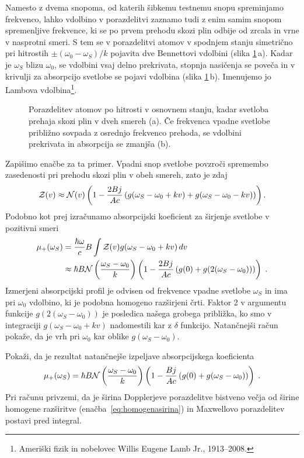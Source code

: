 Namesto z dvema snopoma, od katerih šibkemu testnemu snopu spreminjamo
frekvenco, lahko vdolbino v porazdelitvi zaznamo tudi z enim samim snopom
spremenljive frekvence, ki se po prvem prehodu skozi plin odbije od
zrcala in vrne v nasprotni smeri. S tem se v porazdelitvi atomov
v spodnjem stanju simetrično pri hitrostih $\pm(\omega_{0}-\omega_S)/k$
pojavita dve Bennettovi vdolbini (slika \ref{fig:Lamb}\,a).
Kadar je $\omega_S$ blizu $\omega_{0}$, se vdolbini vsaj delno prekrivata, 
stopnja nasičenja se poveča in v krivulji za absorpcijo svetlobe se pojavi 
vdolbina (slika \ref{fig:Lamb}\,b).
Imenujemo jo Lambova vdolbina\footnote{Ameriški fizik in nobelovec 
Willis Eugene Lamb Jr., 1913--2008.}. 
\begin{figure}[h]
\centering
\def\svgwidth{140truemm} 

\caption{Porazdelitev atomov po hitrosti v osnovnem stanju, kadar svetloba prehaja 
skozi plin v dveh smereh (a). Če frekvenca vpadne svetlobe približno sovpada z osrednjo
frekvenco prehoda, se vdolbini prekrivata in absorpcija se zmanjša (b).}
\label{fig:Lamb}
\end{figure}

Zapišimo enačbe za ta primer. Vpadni snop svetlobe povzroči spremembo zasedenosti
pri prehodu skozi plin v obeh smereh, zato je zdaj 
\begin{equation}
{\cal Z}(v)\approx{\cal N}(v)\left(1-\frac{2Bj}{Ac}\left(g(\omega_S-\omega_{0}+kv)+
g(\omega_S-\omega_{0}-kv)\right)\right).
\label{4.92}
\end{equation}
Podobno kot prej izračunamo absorpcijski koeficient za širjenje svetlobe v
pozitivni smeri 
\begin{align}
\mu_{+}(\omega_S) & =  \frac{\hbar\omega}{c}B\int{\cal Z}(v)g(\omega_S-\omega_{0}+kv)\, dv\nonumber \\
 & \approx  \hbar B{\cal N}\left(\frac{\omega_S-\omega_0}{k}\right)\left(1-\frac{2Bj}
 {Ac}\left(g(0)+g(2(\omega_S-\omega_{0}))\right)\right)\;.
 \label{eq:lamb}
\end{align}
Izmerjeni absorpcijski profil je odvisen od frekvence vpadne svetlobe $\omega_S$ in ima pri $\omega_0$ vdolbino,
ki je podobna homogeno razširjeni črti. Faktor 2 v argumentu
funkcije $g(2(\omega_S-\omega_{0}))$ je posledica našega grobega približka,
ko smo v integraciji $g(\omega_S-\omega_{0}+kv)$ nadomestili kar z
$\delta$ funkcijo. Natančnejši račun pokaže, da je vrh pri $\omega_{0}$
kar oblike $g(\omega_S-\omega_{0})$.

\begin{definition}
Pokaži, da je rezultat natančnejše izpeljave absorpcijskega koeficienta  
\begin{equation}
 \mu_{+}(\omega_S) = \hbar B{\cal N}\left(\frac{\omega_S-\omega_0}{k}\right)\left(1-\frac{Bj}
 {Ac}\left(g(0)+g(\omega_S-\omega_{0})\right)\right)\;.
\end{equation}
Pri računu privzemi, da je širina Dopplerjeve porazdelitve bistveno večja od širine homogene
razširitve (enačba~\ref{eq:homogenasirina}) in Maxwellovo porazdelitev postavi pred integral. 
\end{definition}

